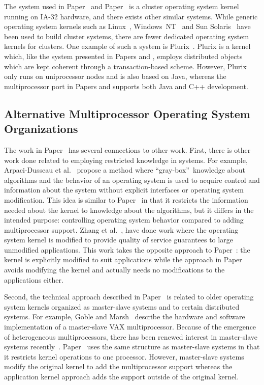 The system used in Paper~ and
Paper~ is a cluster operating system kernel running on
IA-32 hardware, and there exists other similar systems. While generic
operating system kernels such as Linux~\cite{beowulf},
Windows~NT~\cite{microsoft05cluster} and Sun Solaris~\cite{sun99cluster} have
been used to build cluster systems, there are fewer dedicated operating system
kernels for clusters. One example of such a system is
Plurix~\cite{goeckelmann03plurix}. Plurix is a kernel which, like the system
presented in Papers  and ,
employs distributed objects which are kept coherent through a
transaction-based scheme. However, Plurix only runs on uniprocessor nodes and
is also based on Java, whereas the multiprocessor port in Papers
 and  supports both Java and C++
development.

\subsection[Alternative Operating System organizations]{Alternative Multiprocessor Operating System Organizations}
The work in Paper~ has several connections to other
work. First, there is other work done related to employing restricted
knowledge in systems. For example, Arpaci-Dusseau et
al.~\cite{arpacidusseau01information} propose a method where
``gray-box''~knowledge about algorithms and the behavior of an operating
system is used to acquire control and information about the system without
explicit interfaces or operating system modification. This idea is similar to
Paper~ in that it restricts the information needed
about the kernel to knowledge about the algorithms, but it differs in the
intended purpose: controlling operating system behavior compared to adding
multiprocessor support. Zhang et al.~\cite{zhang03qos}, have done work where
the operating system kernel is modified to provide quality of service
guarantees to large unmodified applications. This work takes the opposite
approach to Paper~: the kernel is explicitly modified
to suit applications while the approach in Paper~
avoids modifying the kernel and actually needs no modifications to the
applications either.

Second, the technical approach described in Paper~ is
related to older operating system kernels organized as master-slave systems
and to certain distributed systems. For example, Goble and
Marsh~\cite{goble82dualvax} describe the hardware and software implementation
of a master-slave VAX multiprocessor. Because of the emergence of
heterogeneous multiprocessors, there has been renewed interest in master-slave
systems recently~\cite{seo07masterslave}. Paper~ uses
the same structure as master-slave systems in that it restricts kernel
operations to one processor.  However, master-slave systems modify the
original kernel to add the multiprocessor support whereas the application
kernel approach adds the support outside of the original kernel.


